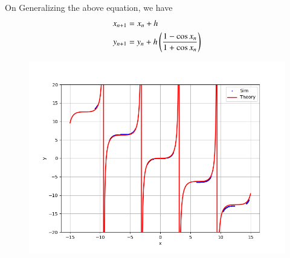 \documentclass[journal]{IEEEtran}
\numberwithin{equation}{enumi}
\numberwithin{figure}{enumi}
\begin{document}
On Generalizing the above equation, we have 
\begin{align}
    x_{n+1}&=x_{n} +h \\
    y_{n+1}&= y_{n}+h\left(\frac{1-\cos{x_n}}{1+\cos{x_n}}\right)  
\end{align}

\begin{figure}[h!]
   \centering
   \includegraphics[width=\columnwidth]{figs/Fig1.png}
\end{figure}
\end{document}
